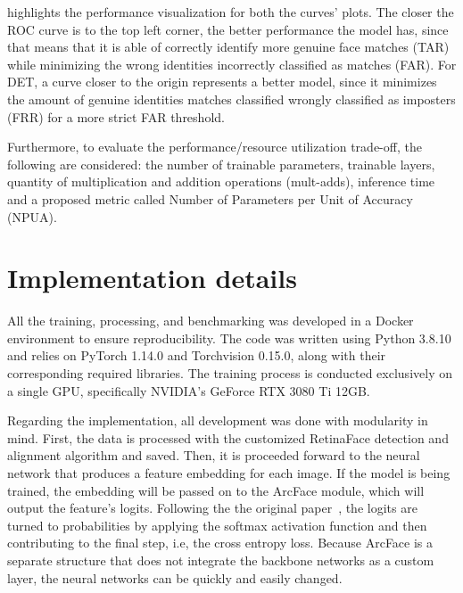 \documentclass[class=report, crop=false, a4paper, 12pt]{standalone}
\begin{document}
\par {} highlights the performance visualization for both the curves' plots. The closer the ROC curve is to the top left corner, the better performance the model has, since that means that it is able of correctly identify more genuine face matches (TAR) while minimizing the wrong identities incorrectly classified as matches (FAR). For DET, a curve closer to the origin represents a better model, since it minimizes the amount of genuine identities matches classified wrongly classified as imposters (FRR) for a more strict FAR threshold.
\par Furthermore, to evaluate the performance/resource utilization trade-off, the following are considered: the number of trainable parameters, trainable layers, quantity of multiplication and addition operations (mult-adds), inference time and a proposed metric called Number of Parameters per Unit of Accuracy (NPUA). 

\section{Implementation details}
\par All the training, processing, and benchmarking was developed in a Docker environment to ensure reproducibility. The code was written using Python 3.8.10 and relies on PyTorch 1.14.0 and Torchvision 0.15.0, along with their corresponding required libraries. The training process is conducted exclusively on a single GPU, specifically NVIDIA's GeForce RTX 3080 Ti 12GB. 
\par Regarding the implementation, all development was done with modularity in mind. First, the data is processed with the customized RetinaFace detection and alignment algorithm and saved. Then, it is proceeded forward to the neural network that produces a feature embedding for each image. If the model is being trained, the embedding will be passed on to the ArcFace module, which will output the feature's logits. Following the the original paper~\autocite{dengArcFaceAdditiveAngular}, the logits are turned to probabilities by applying the softmax activation function and then contributing to the final step, i.e, the cross entropy loss. Because ArcFace is a separate structure that does not integrate the backbone networks as a custom layer, the neural networks can be quickly and easily changed.
\end{document}
